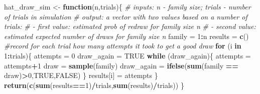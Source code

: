 \documentclass[
]{book}
\newenvironment{Shaded}{\begin{snugshade}}{\end{snugshade}}
\newcommand{\CommentTok}[1]{\textcolor[rgb]{0.56,0.35,0.01}{\textit{#1}}}
\newcommand{\ConstantTok}[1]{\textcolor[rgb]{0.56,0.35,0.01}{#1}}
\newcommand{\ControlFlowTok}[1]{\textcolor[rgb]{0.13,0.29,0.53}{\textbf{#1}}}
\newcommand{\DecValTok}[1]{\textcolor[rgb]{0.00,0.00,0.81}{#1}}
\newcommand{\FunctionTok}[1]{\textcolor[rgb]{0.13,0.29,0.53}{\textbf{#1}}}
\newcommand{\NormalTok}[1]{#1}
\newcommand{\OtherTok}[1]{\textcolor[rgb]{0.56,0.35,0.01}{#1}}
\newcommand{\SpecialCharTok}[1]{\textcolor[rgb]{0.81,0.36,0.00}{\textbf{#1}}}
\theoremstyle{definition}
\theoremstyle{definition}
\theoremstyle{definition}
\theoremstyle{definition}
\theoremstyle{remark}
\begin{document}
\begin{Shaded}
\begin{Highlighting}[]
\NormalTok{hat\_draw\_sim }\OtherTok{\textless{}{-}} \ControlFlowTok{function}\NormalTok{(n,trials)\{}
  \CommentTok{\# inputs: n {-} family size; trials {-} number of trials in simulation}
  \CommentTok{\# output: a vector with two values based on a number of trials:}
       \CommentTok{\# {-} first value: estimated prob of redraw for family size n}
       \CommentTok{\# {-} second value: estimated expected number of draws for family size n}
\NormalTok{  family }\OtherTok{=} \DecValTok{1}\SpecialCharTok{:}\NormalTok{n }
\NormalTok{  results }\OtherTok{=} \FunctionTok{c}\NormalTok{() }\CommentTok{\#record for each trial how many attempts it took to get a good draw}
  \ControlFlowTok{for}\NormalTok{ (i }\ControlFlowTok{in} \DecValTok{1}\SpecialCharTok{:}\NormalTok{trials)\{}
\NormalTok{    attempts }\OtherTok{=} \DecValTok{0}
\NormalTok{    draw\_again }\OtherTok{=} \ConstantTok{TRUE}
    \ControlFlowTok{while}\NormalTok{ (draw\_again)\{}
\NormalTok{      attempts }\OtherTok{=}\NormalTok{ attempts}\SpecialCharTok{+}\DecValTok{1}
\NormalTok{      draw }\OtherTok{=} \FunctionTok{sample}\NormalTok{(family)}
\NormalTok{      draw\_again }\OtherTok{=} \FunctionTok{ifelse}\NormalTok{(}\FunctionTok{sum}\NormalTok{(family }\SpecialCharTok{==}\NormalTok{ draw)}\SpecialCharTok{\textgreater{}}\DecValTok{0}\NormalTok{,}\ConstantTok{TRUE}\NormalTok{,}\ConstantTok{FALSE}\NormalTok{)}
\NormalTok{    \}}
\NormalTok{    results[i] }\OtherTok{=}\NormalTok{ attempts}
\NormalTok{  \}}
  \FunctionTok{return}\NormalTok{(}\FunctionTok{c}\NormalTok{(}\FunctionTok{sum}\NormalTok{(results}\SpecialCharTok{==}\DecValTok{1}\NormalTok{)}\SpecialCharTok{/}\NormalTok{trials,}\FunctionTok{sum}\NormalTok{(results)}\SpecialCharTok{/}\NormalTok{trials))}
\NormalTok{\}}
\end{Highlighting}
\end{Shaded}
\end{document}
